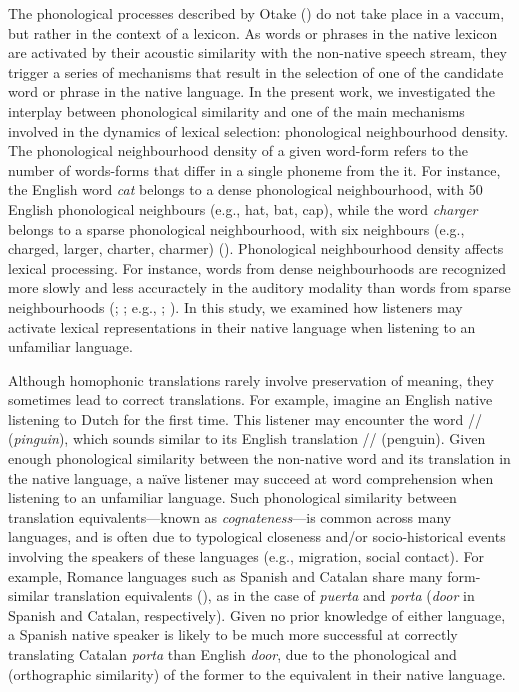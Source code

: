 \documentclass[
]{article}
\begin{document}
The phonological processes described by Otake
() do not take place in a
vaccum, but rather in the context of a lexicon. As words or phrases in
the native lexicon are activated by their acoustic similarity with the
non-native speech stream, they trigger a series of mechanisms that
result in the selection of one of the candidate word or phrase in the
native language. In the present work, we investigated the interplay
between phonological similarity and one of the main mechanisms involved
in the dynamics of lexical selection: phonological neighbourhood
density. The phonological neighbourhood density of a given word-form
refers to the number of words-forms that differ in a single phoneme from
the it. For instance, the English word \emph{cat} belongs to a dense
phonological neighbourhood, with 50 English phonological neighbours
(e.g., hat, bat, cap), while the word \emph{charger} belongs to a sparse
phonological neighbourhood, with six neighbours (e.g., charged, larger,
charter, charmer) (). Phonological neighbourhood density affects lexical processing.
For instance, words from dense neighbourhoods are recognized more slowly
and less accuractely in the auditory modality than words from sparse
neighbourhoods (; ; e.g.,
;
). In this
study, we examined how listeners may activate lexical representations in
their native language when listening to an unfamiliar language.

Although homophonic translations rarely involve preservation of meaning,
they sometimes lead to correct translations. For example, imagine an
English native listening to Dutch for the first time. This listener may
encounter the word // (\emph{pinguin}), which sounds
similar to its English translation // (penguin). Given
enough phonological similarity between the non-native word and its
translation in the native language, a naïve listener may succeed at word
comprehension when listening to an unfamiliar language. Such
phonological similarity between translation equivalents---known as
\emph{cognateness}---is common across many languages, and is often due
to typological closeness and/or socio-historical events involving the
speakers of these languages (e.g., migration, social contact). For
example, Romance languages such as Spanish and Catalan share many
form-similar translation equivalents
(), as in
the case of \emph{puerta} and \emph{porta} (\emph{door} in Spanish and
Catalan, respectively). Given no prior knowledge of either language, a
Spanish native speaker is likely to be much more successful at correctly
translating Catalan \emph{porta} than English \emph{door}, due to the
phonological and (orthographic similarity) of the former to the
equivalent in their native language.
\end{document}
